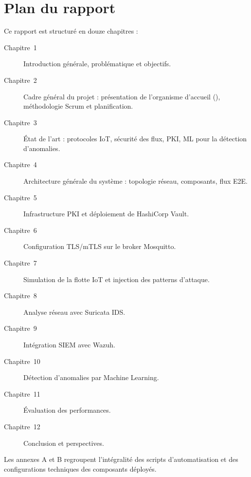 \section{Plan du rapport}

Ce rapport est structuré en douze chapitres :

\begin{description}
  \item[Chapitre~1] Introduction générale, problématique et objectifs.
  \item[Chapitre~2] Cadre général du projet : présentation de l'organisme d'accueil (\TT{}), méthodologie Scrum et planification.
  \item[Chapitre~3] État de l'art : protocoles IoT, sécurité des flux, PKI, ML pour la détection d'anomalies.
  \item[Chapitre~4] Architecture générale du système : topologie réseau, composants, flux E2E.
  \item[Chapitre~5] Infrastructure PKI et déploiement de HashiCorp Vault.
  \item[Chapitre~6] Configuration TLS/mTLS sur le broker Mosquitto.
  \item[Chapitre~7] Simulation de la flotte IoT et injection des patterns d'attaque.
  \item[Chapitre~8] Analyse réseau avec Suricata IDS.
  \item[Chapitre~9] Intégration SIEM avec Wazuh.
  \item[Chapitre~10] Détection d'anomalies par Machine Learning.
  \item[Chapitre~11] Évaluation des performances.
  \item[Chapitre~12] Conclusion et perspectives.
\end{description}

Les annexes A et B regroupent l'intégralité des scripts d'automatisation et des configurations techniques des composants déployés.
